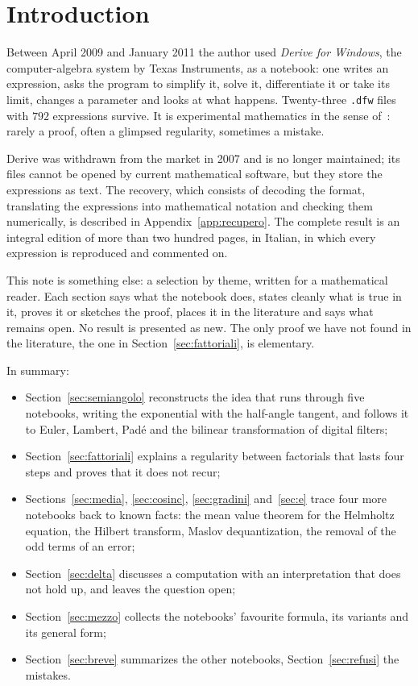 \section{Introduction}
\label{sec:intro}

Between April 2009 and January 2011 the author used \emph{Derive for
Windows}, the computer-algebra system by Texas Instruments, as a notebook: one
writes an expression, asks the program to simplify it, solve it,
differentiate it or take its limit, changes a parameter and looks at what
happens. Twenty-three \texttt{.dfw} files with $792$ expressions survive. It
is experimental mathematics in the sense of~\cite{borwein2008}: rarely a
proof, often a glimpsed regularity, sometimes a mistake.

Derive was withdrawn from the market in 2007 and is no longer maintained;
its files cannot be opened by current mathematical software, but they store
the expressions as text. The recovery, which
consists of decoding the format, translating the expressions into
mathematical notation and checking them numerically, is described in
Appendix~\ref{app:recupero}. The complete result is an integral edition of
more than two hundred pages, in Italian, in which every expression is
reproduced and commented on.

This note is something else: a selection by theme, written for a
mathematical reader. Each section says what the notebook does, states cleanly
what is true in it, proves it or sketches the proof, places it in the
literature and says what remains open. No result is presented as new. The
only proof we have not found in the literature, the one in
Section~\ref{sec:fattoriali}, is elementary.

In summary:
\begin{itemize}[leftmargin=1.4em,itemsep=1pt]
  \item Section~\ref{sec:semiangolo} reconstructs the idea that runs through
        five notebooks, writing the exponential with the half-angle tangent,
        and follows it to Euler, Lambert, Pad\'e and the bilinear
        transformation of digital filters;
  \item Section~\ref{sec:fattoriali} explains a regularity between
        factorials that lasts four steps and proves that it does not recur;
  \item Sections~\ref{sec:media}, \ref{sec:cosinc}, \ref{sec:gradini}
        and~\ref{sec:e} trace four more notebooks back to known facts: the
        mean value theorem for the Helmholtz equation, the Hilbert transform,
        Maslov dequantization, the removal of the odd terms of an error;
  \item Section~\ref{sec:delta} discusses a computation with an
        interpretation that does not hold up, and leaves the question open;
  \item Section~\ref{sec:mezzo} collects the notebooks' favourite formula,
        its variants and its general form;
  \item Section~\ref{sec:breve} summarizes the other notebooks,
        Section~\ref{sec:refusi} the mistakes.
\end{itemize}

